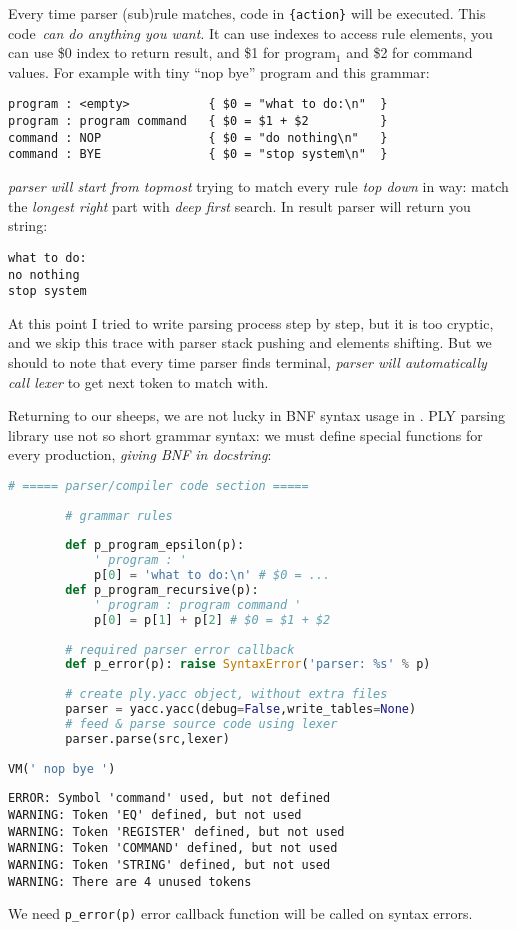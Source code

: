Every time parser (sub)rule matches, code in \verb|{action}| will be
executed. This code\ \emph{can do anything you want}. It can
use indexes to access rule elements, you can use \$0 index to return
result, and
\$1 for program${_1}$ and \$2 for command values. For example with tiny ``nop
bye'' program and this grammar:
\begin{lstlisting}
program : <empty>			{ $0 = "what to do:\n"	}
program : program command	{ $0 = $1 + $2			}
command : NOP				{ $0 = "do nothing\n"	}
command : BYE				{ $0 = "stop system\n"	}
\end{lstlisting}
\emph{parser will start from topmost}  trying to match every rule
\emph{top down} in  way: match the \emph{longest right} part with
\emph{deep first} search. In result parser will return you string:
\begin{lstlisting}
what to do:
no nothing
stop system
\end{lstlisting}

\bigskip
At this point I tried to write parsing process step by step, but it is too
cryptic, and we skip this trace with parser stack pushing and elements shifting.
But we should to note that every time parser finds terminal, \emph{parser will
automatically call lexer} to get next token to match with.

\clearpage
Returning to our sheeps, we are not lucky in BNF syntax usage in \py.
PLY parsing library use not so short grammar syntax: we must define special
functions for every production, \emph{giving BNF in docstring}:
\begin{lstlisting}[language=python]
		# ===== parser/compiler code section =====
		
		# grammar rules
		
		def p_program_epsilon(p):
			' program : '
			p[0] = 'what to do:\n' # $0 = ...
		def p_program_recursive(p):
			' program : program command '
			p[0] = p[1] + p[2] # $0 = $1 + $2
			
		# required parser error callback
		def p_error(p): raise SyntaxError('parser: %s' % p)
		
		# create ply.yacc object, without extra files
		parser = yacc.yacc(debug=False,write_tables=None)
		# feed & parse source code using lexer
		parser.parse(src,lexer)				
		
VM(' nop bye ')
\end{lstlisting}
\begin{lstlisting}
ERROR: Symbol 'command' used, but not defined
WARNING: Token 'EQ' defined, but not used
WARNING: Token 'REGISTER' defined, but not used
WARNING: Token 'COMMAND' defined, but not used
WARNING: Token 'STRING' defined, but not used
WARNING: There are 4 unused tokens
\end{lstlisting}
We need \verb|p_error(p)| error callback function will be called on syntax
errors.

